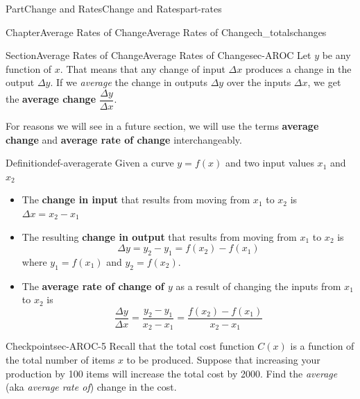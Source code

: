 \documentclass[oneside,10pt,]{tufte-book}
\newcommand{\terminology}[1]{\textbf{#1}}
\numberwithin{equation}{chapter}
\begin{document}
\begin{partptx}{Part}{Change and Rates}{}{Change and Rates}{}{}{part-rates}
\begin{chapterptx}{Chapter}{Average Rates of Change}{}{Average Rates of Change}{}{}{ch_totalschanges}
\begin{introduction}{}
\begin{image}{0}{1}{0}{}
{
}%
\end{image}%
\end{introduction}%
%
%
\typeout{************************************************}
\typeout{************************************************}
%
\begin{sectionptx}{Section}{Average Rates of Change}{}{Average Rates of Change}{}{}{sec-AROC}
Let \(y\) be any function of \(x\). That means that any change of input \(\Delta x\) produces a change in the output \(\Delta y\). If we \emph{average} the change in outputs \(\Delta y\) over the inputs \(\Delta x\), we get the \terminology{average change} \(\dfrac{\Delta y}{\Delta x}\).%
\par
For reasons we will see in a future section, we will use the terms \terminology{average change} and \terminology{average rate of change} interchangeably.%
\begin{definition}{Definition}{}{def-averagerate}%
Given a curve \(y=f(x)\) and two input values \(x_1\) and \(x_2\)%
\begin{itemize}[label=\textbullet]
\item{}The \terminology{change in input} that results from moving from \(x_1\) to \(x_2\) is \(\Delta x = x_2-x_1\)%
\item{}The resulting \terminology{change in output} that results from moving from \(x_1\) to \(x_2\) is%
\begin{equation*}
\Delta y = y_2-y_1 = f(x_2) - f(x_1)
\end{equation*}
where \(y_1 = f(x_1)\) and \(y_2=f(x_2)\).%
\item{}The \terminology{average rate of change of \(y\)} as a result of changing the inputs from \(x_1\) to \(x_2\) is%
\begin{equation*}
\dfrac{\Delta y}{\Delta x} = \dfrac{y_2-y_1}{x_2-x_1} = \dfrac{f(x_2) - f(x_1)}{x_2-x_1}
\end{equation*}
%
\end{itemize}
%
\end{definition}
\begin{inlineexercise}{Checkpoint}{}{sec-AROC-5}%
Recall that the total cost function \(C(x)\) is a function of the total number of items \(x\) to be produced. Suppose that increasing your production by 100 items will increase the total cost by \textdollar{}2000. Find the \emph{average} (aka \emph{average rate of}) change in the cost.%

\end{inlineexercise}
\end{sectionptx}
\end{chapterptx}
\end{partptx}
\end{document}
